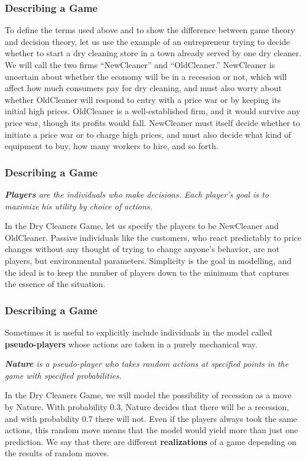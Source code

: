  \begin{frame}[fragile]\frametitle{Describing a Game}
To define the  terms used above  and to show the difference between game theory
and decision theory,  let us use the example of an entrepreneur trying to decide
whether to start a dry cleaning store in a   town   already served by one dry
cleaner.  We will call the two firms ``NewCleaner'' and ``OldCleaner.''
NewCleaner  is uncertain about whether the economy will be in a recession or
not,  which will affect how much consumers pay for dry cleaning,   and must also
worry about whether OldCleaner will respond to entry with a price war or by
keeping its initial high prices.  OldCleaner is a well-established firm, and it
would survive any price war, though its profits would fall. NewCleaner must
itself decide whether to initiate a price war or to charge high prices, and must
also decide what kind of equipment to buy, how many workers to hire, and so
forth.
\end{frame}


 \begin{frame}[fragile]\frametitle{Describing a Game}
{\it{\bf Players} are the individuals who make decisions. Each
player's goal is to maximize his utility by choice of actions.}

In the Dry Cleaners Game,   let us specify the players to be NewCleaner and
OldCleaner. Passive individuals like the customers, who react predictably to
price changes without any thought of trying to change anyone's behavior, are not
players, but environmental parameters. Simplicity is the goal in modelling, and
the ideal is to keep the number of players down to the minimum that captures the
essence of the situation.
\end{frame}


 \begin{frame}[fragile]\frametitle{Describing a Game}

Sometimes   it is  useful to explicitly include individuals in the model called
{\bf pseudo-players} whose actions are taken in a purely mechanical way.

 {\it {\bf Nature} is a pseudo-player who takes random actions at
specified points in the game with specified probabilities.}

  In the Dry Cleaners Game, we will model  the possibility of recession as a
move by Nature.  With probability 0.3, Nature decides that there will be a
recession, and with probability 0.7 there will not.       Even if the players
always took the same actions, this random move means that the model would yield
more than just one prediction. We say that there are different {\bf
realizations} of a game depending on the results of random moves.
\end{frame}


